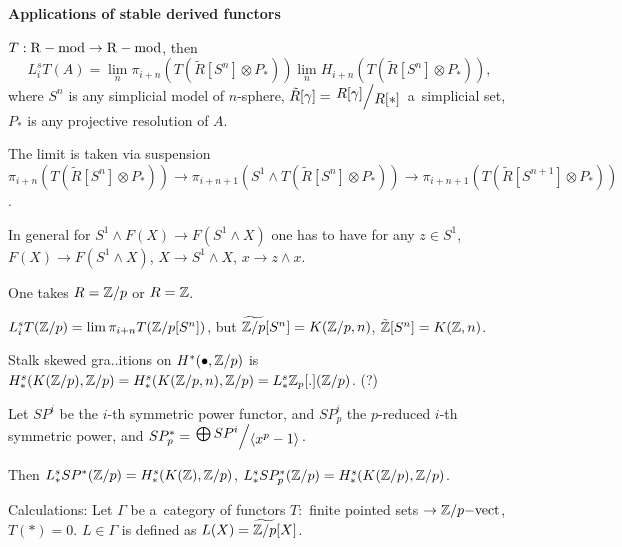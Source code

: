 



    {\bf Applications of stable derived functors}
    
    \begin{theorem}
        $T:\mathrm{R-mod} \to \mathrm{R-mod}$, then 
        $$L_i^sT(A) = \lim_n \pi_{i+n}(T(\tilde{R}[S^n] \otimes P_\ast))
        \lim_n H_{i+n}(T(\tilde{R}[S^n] \otimes P_\ast)),$$
        where $S^n$ is any simplicial model of $n$-sphere,
        $\tilde{R}[\gamma] = \bigslant{R[\gamma]}{R[\ast]}$ a~simplicial set,
        $P_\ast$ is any projective resolution of $A$.
        
        The limit is taken via suspension
        \\ $\pi_{i+n}(T(\tilde{R}[S^n] \otimes P_\ast)) 
        \to \pi_{i+n+1}(S^1 \wedge T(\tilde{R}[S^n] \otimes P_\ast))
        \to \pi_{i+n+1}(T(\tilde{R}[S^{n+1}] \otimes P_\ast))$.
    \end{theorem}
        
    In general for $S^1 \wedge F(X) \to F(S^1 \wedge X)$
    one has to have for any $z \in S^1$,
    ${F(X) \to F(S^1 \wedge X)}$, $X \to S^1 \wedge X$, $x \to z \wedge x$.
    
    One takes $R = {\mathbb{Z}} / p$ or $R = {\mathbb{Z}}$.
    
    $L_i^sT({\mathbb{Z}}/p) = \lim \pi_{i+n} T({\mathbb{Z}}/p [S^n])$,
    but $\widetilde{{\mathbb{Z}}/p}[S^n] = K({\mathbb{Z}}/p,n)$,
    $\tilde{{\mathbb{Z}}}[S^n] = K({\mathbb{Z}}, n)$.
    
    Stalk skewed gra..itions on $H^\ast(\bullet, {\mathbb{Z}}/p)$
    is \\$H_\ast^s(K({\mathbb{Z}}/p),{\mathbb{Z}}/p) 
    = H_\ast^s(K({\mathbb{Z}}/p,n),{\mathbb{Z}}/p)
    = L_\ast^s {\mathbb{Z}}_p[.]({\mathbb{Z}}/p)$. (?)
    
    \begin{theorem}
        Let $SP^i$ be the $i$-th symmetric power functor,
        and $SP^i_p$ the $p$-reduced $i$-th symmetric power,
        and $SP^\ast_p = \bigslant{\bigoplus SP^i}{\langle x^p - 1 \rangle}$.
        
        Then $L_\ast^s SP^\ast({\mathbb{Z}}/p) = H_\ast^s(K({\mathbb{Z}}),{\mathbb{Z}}/p)$,
        $L_\ast^s SP_p^\ast({\mathbb{Z}}/p) = H_\ast^s(K({\mathbb{Z}}/p),{\mathbb{Z}}/p)$.
    \end{theorem}
    
    Calculations: Let $\Gamma$ be a~category of functors 
    $T:$ finite pointed sets $\to {\mathbb{Z}}/p{\mathrm{-vect}}$,
    \\$T(\ast)=0$. 
    $L \in \Gamma$ is defined as $L(X) = \widetilde{{\mathbb{Z}}/p}[X]$.
    
